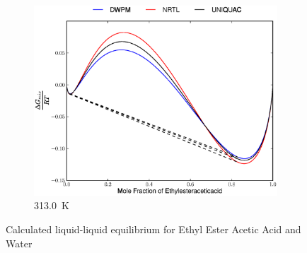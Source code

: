 \vspace*{\fill}
\clearpage
\begin{figure}[hpt]
\ContinuedFloat 
\begin{subfigure}[h]{0.5\textwidth}
	\centering
	\includegraphics[width = \textwidth]{Results_Parts/BinaryParams/ethylesteraceticacid-water/AllModelsGibbsPlots/T_313.0.eps}
	\caption{313.0~$\mathrm{K}$}
\end{subfigure}%
\caption[]{Calculated liquid-liquid equilibrium for Ethyl Ester Acetic Acid and Water}
\end{figure}
\clearpage

